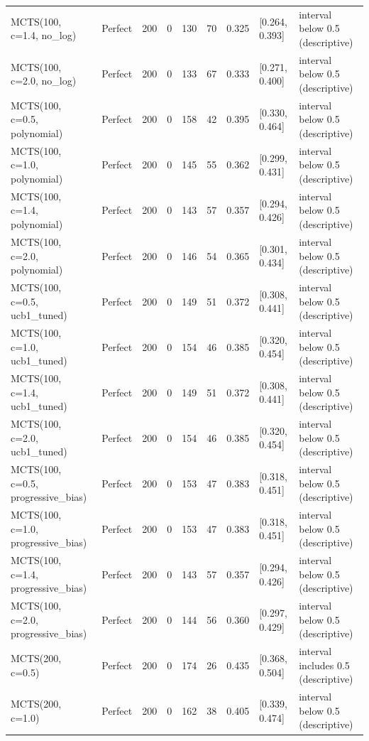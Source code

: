 \begin{table}[!t]
\begin{tabular}{llrrrrrll}
MCTS(100, c=1.4, no\_log) & Perfect & 200 & 0 & 130 & 70 & 0.325 & [0.264, 0.393] & interval below 0.5 (descriptive) \\
MCTS(100, c=2.0, no\_log) & Perfect & 200 & 0 & 133 & 67 & 0.333 & [0.271, 0.400] & interval below 0.5 (descriptive) \\
MCTS(100, c=0.5, polynomial) & Perfect & 200 & 0 & 158 & 42 & 0.395 & [0.330, 0.464] & interval below 0.5 (descriptive) \\
MCTS(100, c=1.0, polynomial) & Perfect & 200 & 0 & 145 & 55 & 0.362 & [0.299, 0.431] & interval below 0.5 (descriptive) \\
MCTS(100, c=1.4, polynomial) & Perfect & 200 & 0 & 143 & 57 & 0.357 & [0.294, 0.426] & interval below 0.5 (descriptive) \\
MCTS(100, c=2.0, polynomial) & Perfect & 200 & 0 & 146 & 54 & 0.365 & [0.301, 0.434] & interval below 0.5 (descriptive) \\
MCTS(100, c=0.5, ucb1\_tuned) & Perfect & 200 & 0 & 149 & 51 & 0.372 & [0.308, 0.441] & interval below 0.5 (descriptive) \\
MCTS(100, c=1.0, ucb1\_tuned) & Perfect & 200 & 0 & 154 & 46 & 0.385 & [0.320, 0.454] & interval below 0.5 (descriptive) \\
MCTS(100, c=1.4, ucb1\_tuned) & Perfect & 200 & 0 & 149 & 51 & 0.372 & [0.308, 0.441] & interval below 0.5 (descriptive) \\
MCTS(100, c=2.0, ucb1\_tuned) & Perfect & 200 & 0 & 154 & 46 & 0.385 & [0.320, 0.454] & interval below 0.5 (descriptive) \\
MCTS(100, c=0.5, progressive\_bias) & Perfect & 200 & 0 & 153 & 47 & 0.383 & [0.318, 0.451] & interval below 0.5 (descriptive) \\
MCTS(100, c=1.0, progressive\_bias) & Perfect & 200 & 0 & 153 & 47 & 0.383 & [0.318, 0.451] & interval below 0.5 (descriptive) \\
MCTS(100, c=1.4, progressive\_bias) & Perfect & 200 & 0 & 143 & 57 & 0.357 & [0.294, 0.426] & interval below 0.5 (descriptive) \\
MCTS(100, c=2.0, progressive\_bias) & Perfect & 200 & 0 & 144 & 56 & 0.360 & [0.297, 0.429] & interval below 0.5 (descriptive) \\
MCTS(200, c=0.5) & Perfect & 200 & 0 & 174 & 26 & 0.435 & [0.368, 0.504] & interval includes 0.5 (descriptive) \\
MCTS(200, c=1.0) & Perfect & 200 & 0 & 162 & 38 & 0.405 & [0.339, 0.474] & interval below 0.5 (descriptive) \\

\end{tabular}
\end{table}
